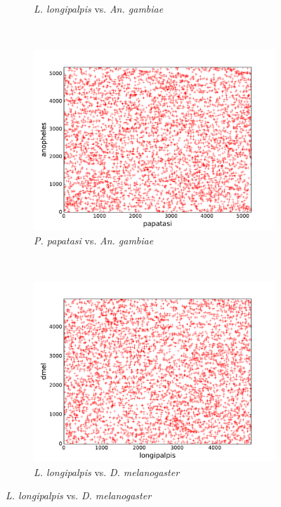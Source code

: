 \begin{figure}[H]
\begin{subfigure}[b]{0.45\textwidth}
    \caption{\emph{L. longipalpis} vs. \emph{An. gambiae}}
    \label{fig:synteny-dotplots-longipalpis-anopheles}
  \end{subfigure}
  ~
  \begin{subfigure}[b]{0.45\textwidth}
    \includegraphics[width=\textwidth]{figures/synteny/papatasi_anopheles_plot}
    \caption{\emph{P. papatasi} vs. \emph{An. gambiae}}
    \label{fig:synteny-dotplots-papatasi-anopheles}
  \end{subfigure}
  ~
  \begin{subfigure}[b]{0.45\textwidth}
    \includegraphics[width=\textwidth]{figures/synteny/longipalpis_dmel_plot}
    \caption{\emph{L. longipalpis} vs. \emph{D. melanogaster}}
    \label{fig:synteny-dotplots-longipalpis-dmel}

\end{subfigure}
\end{figure}
